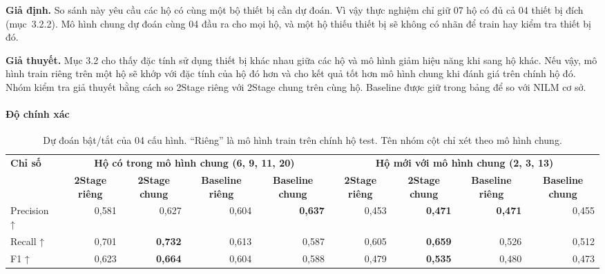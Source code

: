 \textbf{Giả định.} So sánh này yêu cầu các hộ có cùng một bộ thiết bị cần dự đoán. Vì vậy thực nghiệm chỉ giữ 07 hộ có đủ cả 04 thiết bị đích (mục~3.2.2). Mô hình chung dự đoán cùng 04 đầu ra cho mọi hộ, và một hộ thiếu thiết bị sẽ không có nhãn để train hay kiểm tra thiết bị đó.

\textbf{Giả thuyết.} Mục 3.2 cho thấy đặc tính sử dụng thiết bị khác nhau giữa các hộ và mô hình giảm hiệu năng khi sang hộ khác. Nếu vậy, mô hình train riêng trên một hộ sẽ khớp với đặc tính của hộ đó hơn và cho kết quả tốt hơn mô hình chung khi đánh giá trên chính hộ đó. Nhóm kiểm tra giả thuyết bằng cách so 2Stage riêng với 2Stage chung trên cùng hộ. Baseline được giữ trong bảng để so với NILM cơ sở.

\paragraph{Độ chính xác}


\begin{table}[H]
\centering
\caption{Dự đoán bật/tắt của 04 cấu hình. “Riêng” là mô hình train trên chính hộ test. Tên nhóm cột chỉ xét theo mô hình chung.}\label{nilm:tab15}
\footnotesize
\setlength{\tabcolsep}{3.5pt}\renewcommand{\arraystretch}{1.12}
\begin{adjustbox}{max width=\linewidth}
\begin{tabular}{|l|r|r|r|r|r|r|r|r|}
\hline
\multirow{2}{*}{\textbf{Chỉ số}} & \multicolumn{4}{c|}{\textbf{Hộ có trong mô hình chung (6, 9, 11, 20)}} & \multicolumn{4}{c|}{\textbf{Hộ mới với mô hình chung (2, 3, 13)}} \\ \cline{2-9}
 & \multicolumn{1}{c|}{\textbf{2Stage riêng}} & \multicolumn{1}{c|}{\textbf{2Stage chung}} & \multicolumn{1}{c|}{\textbf{Baseline riêng}} & \multicolumn{1}{c|}{\textbf{Baseline chung}} & \multicolumn{1}{c|}{\textbf{2Stage riêng}} & \multicolumn{1}{c|}{\textbf{2Stage chung}} & \multicolumn{1}{c|}{\textbf{Baseline riêng}} & \multicolumn{1}{c|}{\textbf{Baseline chung}} \\ \hline
Precision ↑ & 0,581 & 0,627 & 0,604 & \textbf{0,637} & 0,453 & \textbf{0,471} & \textbf{0,471} & 0,455 \\ \hline
Recall ↑ & 0,701 & \textbf{0,732} & 0,613 & 0,587 & 0,605 & \textbf{0,659} & 0,526 & 0,512 \\ \hline
F1 ↑ & 0,623 & \textbf{0,664} & 0,604 & 0,588 & 0,479 & \textbf{0,535} & 0,480 & 0,473 \\ \hline
\end{tabular}
\end{adjustbox}
\end{table}


